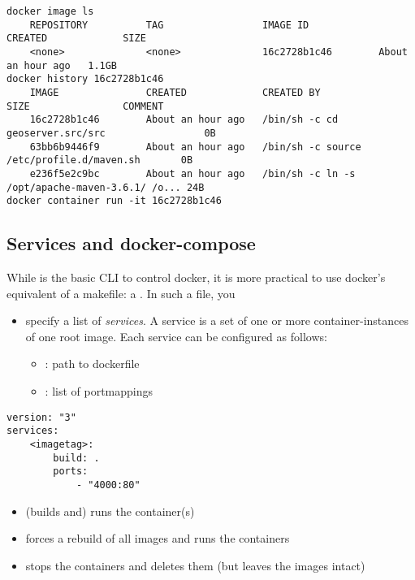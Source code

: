 \begin{lstlisting}
docker image ls 
    REPOSITORY          TAG                 IMAGE ID            CREATED             SIZE
    <none>              <none>              16c2728b1c46        About an hour ago   1.1GB
docker history 16c2728b1c46
    IMAGE               CREATED             CREATED BY                                      SIZE                COMMENT
    16c2728b1c46        About an hour ago   /bin/sh -c cd geoserver.src/src                 0B
    63bb6b9446f9        About an hour ago   /bin/sh -c source /etc/profile.d/maven.sh       0B
    e236f5e2c9bc        About an hour ago   /bin/sh -c ln -s /opt/apache-maven-3.6.1/ /o... 24B
docker container run -it 16c2728b1c46
\end{lstlisting}


\subsection{Services and docker-compose}
While  is the basic CLI to control docker, it is more practical to use docker's equivalent of a makefile: a . In such a file, you
\begin{itemize}
    \item specify a list of \emph{services}. A service is a set of one or more container-instances of one root image. Each service can be configured as follows:
    \begin{itemize}
        \item {}: path to dockerfile
        \item {}: list of portmappings
    \end{itemize}
\end{itemize}


\begin{lstlisting}
version: "3"
services: 
    <imagetag>: 
        build: .
        ports: 
            - "4000:80"
\end{lstlisting}

\begin{itemize}
    \item {} (builds and) runs the container(s)
    \item {} forces a rebuild of all images and runs the containers
    \item {} stops the containers and deletes them (but leaves the images intact)
\end{itemize}
